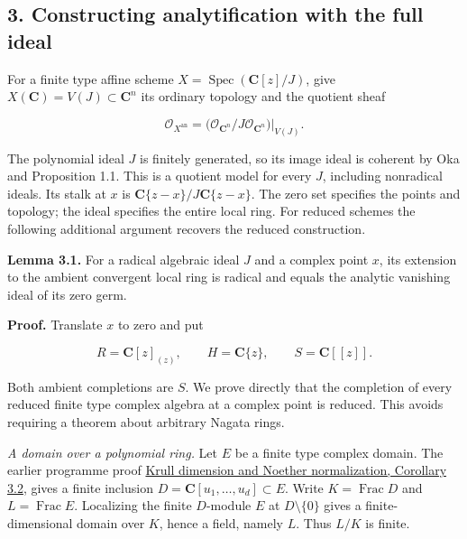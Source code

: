 \documentclass[11pt]{article}
\begin{document}
\subsection{3. Constructing analytification with the full
ideal}\label{constructing-analytification-with-the-full-ideal}

For a finite type affine scheme
\(X=\operatorname{Spec}(\mathbf C[z]/J)\), give
\(X(\mathbf C)=V(J)\subset\mathbf C^n\) its ordinary topology and the
quotient sheaf

\[
\mathcal O_{X^{\mathrm{an}}}
=\bigl(\mathcal O_{\mathbf C^n}/J\mathcal O_{\mathbf C^n}\bigr)|_{V(J)}.
\]

The polynomial ideal \(J\) is finitely generated, so its image ideal is
coherent by Oka and Proposition 1.1. This is a quotient model for every
\(J\), including nonradical ideals. Its stalk at \(x\) is
\(\mathbf C\{z-x\}/J\mathbf C\{z-x\}\). The zero set specifies the
points and topology; the ideal specifies the entire local ring. For
reduced schemes the following additional argument recovers the reduced
construction.

\textbf{Lemma 3.1.} For a radical algebraic ideal \(J\) and a complex
point \(x\), its extension to the ambient convergent local ring is
radical and equals the analytic vanishing ideal of its zero germ.

\textbf{Proof.} Translate \(x\) to zero and put

\[
R=\mathbf C[z]_{(z)},\qquad H=\mathbf C\{z\},\qquad S=\mathbf C[[z]].
\]

Both ambient completions are \(S\). We prove directly that the
completion of every reduced finite type complex algebra at a complex
point is reduced. This avoids requiring a theorem about arbitrary Nagata
rings.

\emph{A domain over a polynomial ring.} Let \(E\) be a finite type
complex domain. The earlier programme proof
\href{https://github.com/KokunoYumeto/open-math-courses/blob/d18141573d82588960ab175843821f0b38ab8802/docs/courses/AG-CA/src/krull-dimension-and-noether-normalization.md\#3-normalization-that-respects-ideals}{Krull
dimension and Noether normalization, Corollary 3.2}, gives a finite
inclusion \(D=\mathbf C[u_1,\ldots,u_d]\subset E\). Write
\(K=\operatorname{Frac}D\) and \(L=\operatorname{Frac}E\). Localizing
the finite \(D\)-module \(E\) at \(D\setminus\{0\}\) gives a
finite-dimensional domain over \(K\), hence a field, namely \(L\). Thus
\(L/K\) is finite.
\end{document}
